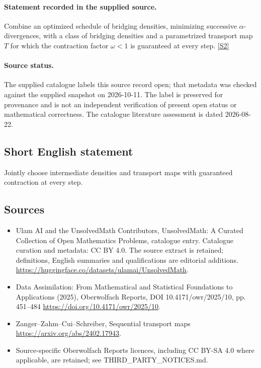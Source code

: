 \documentclass[11pt]{article}
\begin{document}
\paragraph{Statement recorded in the supplied source.}
Combine an optimized schedule of bridging densities, minimizing successive $\alpha$-divergences, with a class of bridging densities and a parametrized transport map $T$ for which the contraction factor $\omega<1$ is guaranteed at every step. \href{https://doi.org/10.4171/owr/2025/10}{[S2]}
\paragraph{Source status.}
The supplied catalogue labels this source record open; that metadata was checked against the supplied snapshot on 2026-10-11. The label is preserved for provenance and is not an independent verification of present open status or mathematical correctness. The catalogue literature assessment is dated 2026-08-22.
\subsection{Short English statement}
Jointly choose intermediate densities and transport maps with guaranteed contraction at every step.
\subsection{Sources}
\begin{itemize}
\item[S1] Ulam AI and the UnsolvedMath Contributors, UnsolvedMath: A Curated Collection of Open Mathematics Problems, catalogue entry. Catalogue curation and metadata: CC BY 4.0. The source extract is retained; definitions, English summaries and qualifications are editorial additions.
\url{https://huggingface.co/datasets/ulamai/UnsolvedMath}.
\item[S2] Data Assimilation: From Mathematical and Statistical Foundations to Applications (2025), Oberwolfach Reports, DOI 10.4171/owr/2025/10, pp. 451--484
\url{https://doi.org/10.4171/owr/2025/10}.
\item[S3] Zanger--Zahm--Cui--Schreiber, Sequential transport maps
\url{https://arxiv.org/abs/2402.17943}.
\item Source-specific Oberwolfach Reports licences, including CC BY-SA 4.0 where applicable, are retained; see THIRD\_PARTY\_NOTICES.md.
\end{itemize}
\end{document}
